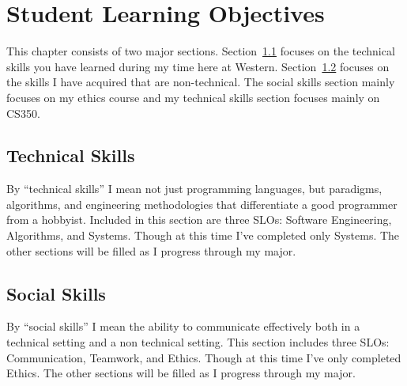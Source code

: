 \chapter{Student Learning Objectives}\label{chap:slos}
This chapter consists of two major sections.  Section~\ref{sect:technicalSkills}
focuses on the technical skills you have learned during my time here at
Western.  Section~\ref{sect:socialSkills} focuses on the skills I have
acquired that are non-technical. The social skills section mainly focuses on my ethics course and my technical skills section focuses mainly on CS350.

\section{Technical Skills}\label{sect:technicalSkills}
By ``technical skills'' I mean not just programming languages, but paradigms, algorithms, and engineering methodologies that differentiate a good programmer from a hobbyist. Included in this section are three SLOs: Software Engineering, Algorithms, and Systems. Though at this time I've completed only Systems. The other sections will be filled as I progress through my major.

%
%


\section{Social Skills}\label{sect:socialSkills}
By ``social skills'' I mean the ability to communicate effectively both in a technical setting and a non technical setting. This section includes three SLOs: Communication, Teamwork, and Ethics. Though at this time I've only completed Ethics. The other sections will be filled as I progress through my major.

%
%
%
